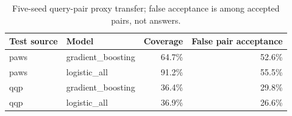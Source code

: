 \begin{table}[H]
\centering
\footnotesize
\caption{Five-seed query-pair proxy transfer; false acceptance is among accepted pairs, not answers.}
\label{tab:learned-proxy}
\begin{tabular}{|l|l|r|r|}
\hline
Test source & Model & Coverage & False pair acceptance \\ \hline
paws & gradient\_boosting & 64.7\% & 52.6\% \\ \hline
paws & logistic\_all & 91.2\% & 55.5\% \\ \hline
qqp & gradient\_boosting & 36.4\% & 29.8\% \\ \hline
qqp & logistic\_all & 36.9\% & 26.6\% \\ \hline
\end{tabular}
\end{table}
